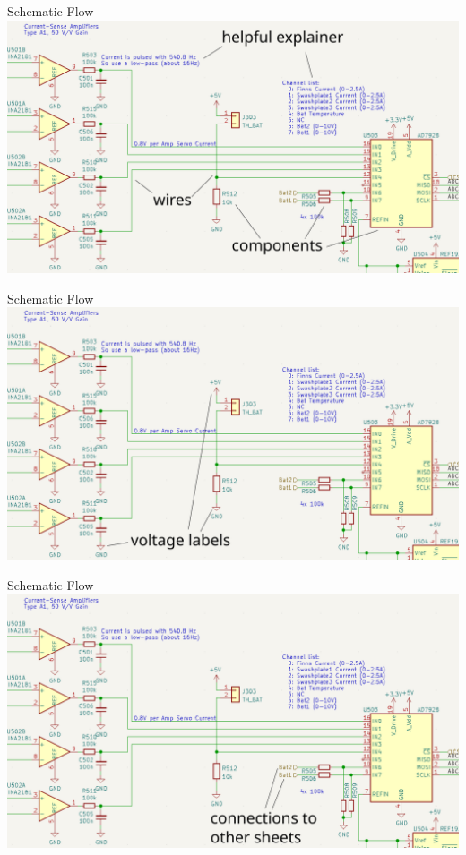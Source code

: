 \documentclass{beamer}
\begin{document}
\begin{frame}{Schematic Flow}
  \includegraphics[width=\textwidth]{images/ex1-1.png} 
\end{frame}

\begin{frame}{Schematic Flow}
  \includegraphics[width=\textwidth]{images/ex1-2.png} 
\end{frame}

\begin{frame}{Schematic Flow}
  \includegraphics[width=\textwidth]{images/ex1-3.png} 
\end{frame}
\end{document}
